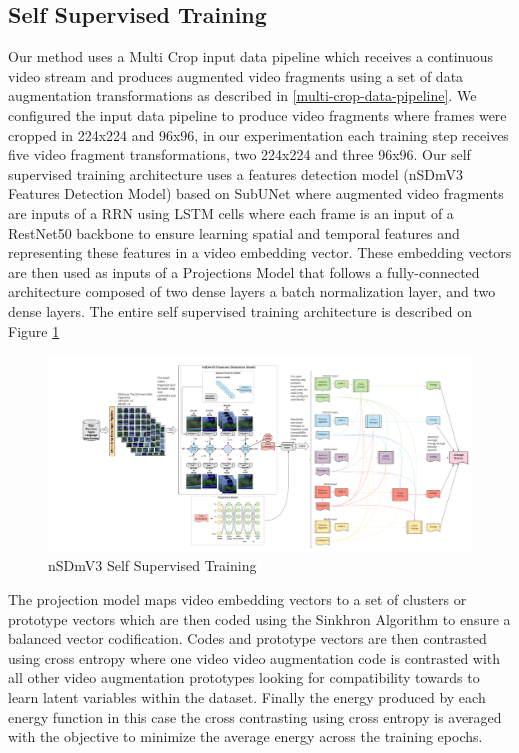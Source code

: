 \documentclass[twocolumn,conference]{article}
\begin{document}
\subsection{Self Supervised Training}\label{self-supervised-training}
Our method uses a Multi Crop input data pipeline which receives a continuous video stream and produces augmented video fragments using a set of data augmentation transformations as described in \ref{multi-crop-data-pipeline}. We configured the input data pipeline to produce video fragments where frames were cropped in 224x224 and 96x96, in our experimentation each training step receives five video fragment transformations, two 224x224 and three 96x96.
Our self supervised training architecture uses a features detection model (nSDmV3 Features Detection Model) based on SubUNet where augmented video fragments are inputs of a RRN using LSTM cells where each frame is an input of a RestNet50 backbone to ensure learning spatial and temporal features and representing these features in a video embedding vector. These embedding vectors are then used as inputs of a Projections Model that follows a fully-connected architecture composed of two dense layers a batch normalization layer, and two dense layers. The entire self supervised training architecture is described on Figure \ref{fig:nsdmv3-self-supervised-training-model-architecture}

\begin{figure}[hbt!]
\includegraphics[width=\textwidth,height=\textheight,keepaspectratio]{images/nsdmv3-self-supervised-training-model-architecture.png}
\caption{nSDmV3 Self Supervised Training}
\label{fig:nsdmv3-self-supervised-training-model-architecture}
\end{figure}

The projection model maps video embedding vectors to a set of clusters or prototype vectors which are then coded using the Sinkhron Algorithm to ensure a balanced vector codification. Codes and prototype vectors are then contrasted using cross entropy where one video video augmentation code is contrasted with all other video augmentation prototypes looking for compatibility towards to learn latent variables within the dataset. Finally the energy produced by each energy function in this case the cross contrasting using cross entropy is averaged with the objective to minimize the average energy across the training epochs.
\end{document}
